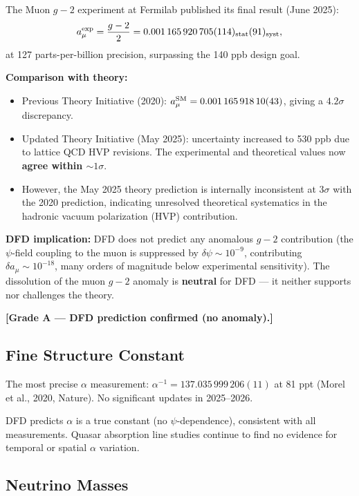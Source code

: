 \documentclass[11pt]{article}
\begin{document}
The Muon $g-2$ experiment at Fermilab published its final result
(June 2025):
\begin{equation}
  a_\mu^{\rm exp} = \frac{g-2}{2} = 0.001\,165\,920\,705(114)_{\rm stat}(91)_{\rm syst},
\end{equation}
at 127 parts-per-billion precision, surpassing the 140 ppb design goal.

\textbf{Comparison with theory:}
\begin{itemize}
  \item Previous Theory Initiative (2020): $a_\mu^{\rm SM} = 0.001\,165\,918\,10(43)$,
    giving a $4.2\sigma$ discrepancy.
  \item Updated Theory Initiative (May 2025): uncertainty increased to
    530 ppb due to lattice QCD HVP revisions. The experimental and
    theoretical values now \textbf{agree within $\sim 1\sigma$}.
  \item However, the May 2025 theory prediction is internally
    inconsistent at $3\sigma$ with the 2020 prediction, indicating
    unresolved theoretical systematics in the hadronic vacuum
    polarization (HVP) contribution.
\end{itemize}

\textbf{DFD implication:} DFD does not predict any anomalous $g-2$
contribution (the $\psi$-field coupling to the muon is suppressed by
$\delta\psi \sim 10^{-9}$, contributing $\delta a_\mu \sim 10^{-18}$,
many orders of magnitude below experimental sensitivity). The dissolution
of the muon $g-2$ anomaly is \textbf{neutral} for DFD --- it neither
supports nor challenges the theory.

\textbf{[Grade A --- DFD prediction confirmed (no anomaly).]}

\subsection{Fine Structure Constant}

The most precise $\alpha$ measurement: $\alpha^{-1} = 137.035\,999\,206(11)$
at 81 ppt (Morel et al., 2020, Nature). No significant updates in
2025--2026.

DFD predicts $\alpha$ is a true constant (no $\psi$-dependence), consistent
with all measurements. Quasar absorption line studies continue to find
no evidence for temporal or spatial $\alpha$ variation.

\subsection{Neutrino Masses}
\end{document}
